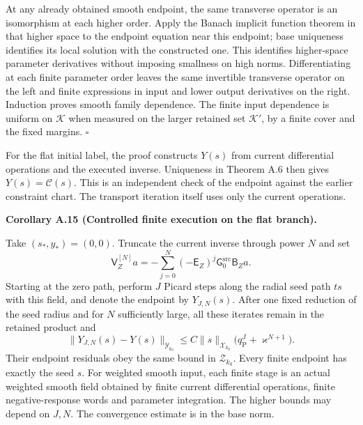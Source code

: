 \documentclass[
  english,
  11pt,
  reqno]{amsart}
\makeatletter
\newcommand{\pandocstatementheading}[1]{%
  \par\if@nobreak\else
    \addpenalty{\@beginparpenalty}%
    \addvspace{.5\baselineskip plus .2\baselineskip minus .2\baselineskip}%
  \fi
  {\normalfont\bfseries #1\par}%
  \nobreak\@afterindenttrue\@afterheading
}
\makeatother
\begin{document}
At any already obtained smooth endpoint, the same transverse operator is
an isomorphism at each higher order. Apply the Banach implicit function
theorem in that higher space to the endpoint equation near this
endpoint; base uniqueness identifies its local solution with the
constructed one. This identifies higher-space parameter derivatives
without imposing smallness on high norms. Differentiating at each finite
parameter order leaves the same invertible transverse operator on the
left and finite expressions in input and lower output derivatives on the
right. Induction proves smooth family dependence. The finite input
dependence is uniform on \(\mathcal K\) when measured on the larger
retained set \(\mathcal K'\), by a finite cover and the fixed margins.
\hfill\(\square\)

For the flat initial label, the proof constructs \(Y(s)\) from current
differential operations and the executed inverse. Uniqueness in Theorem
A.6 then gives \(Y(s)=\mathcal C(s)\). This is an independent check of
the endpoint against the earlier constraint chart. The transport
iteration itself uses only the current operations.

\pandocstatementheading{\leavevmode{}\label{cor:online-current-finite-neumann-picard}Corollary A.15 (Controlled finite execution on the flat branch).}

Take \((s_*,y_*)=(0,0)\). Truncate the current inverse through power
\(N\) and set%
 \[
\mathsf V_Z^{[N]}a
=-\sum_{j=0}^{N}(-\mathsf E_Z)^j
\mathsf G_0^{\mathrm{src}}\mathsf B_Za.
\] Starting at the zero path, perform \(J\) Picard steps along the
radial seed path \(ts\) with this field, and denote the endpoint by
\(Y_{J,N}(s)\). After one fixed reduction of the seed radius and for
\(N\) sufficiently large, all these iterates remain in the retained
product and%
 \[
\|Y_{J,N}(s)-Y(s)\|_{\mathcal Y_{k_0}}
\le C\|s\|_{\mathcal X_{k_0}}
\bigl(q_{\mathrm P}^{J}+\varkappa^{N+1}\bigr).
\] Their endpoint residuals obey the same bound in \(\mathcal Z_{k_0}\).
Every finite endpoint has exactly the seed \(s\). For weighted smooth
input, each finite stage is an actual weighted smooth field obtained by
finite current differential operations, finite negative-response words
and parameter integration. The higher bounds may depend on \(J,N\). The
convergence estimate is in the base norm.
\end{document}
